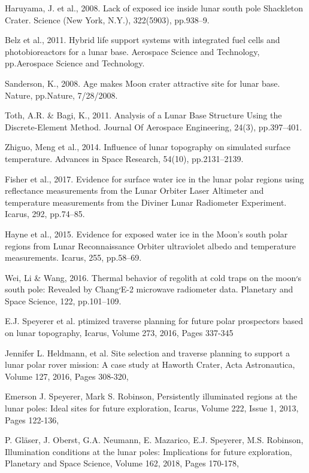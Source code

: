 \documentclass[prl,onecolumn]{revtex4-1}  %
\begin{document}
\begin{thebibliography}{99}
 Haruyama, J. et al., 2008. Lack of exposed ice inside lunar south pole Shackleton Crater. Science (New York, N.Y.), 322(5903), pp.938–9.


 Belz et al., 2011. Hybrid life support systems with integrated fuel cells and photobioreactors for a lunar base. Aerospace Science and Technology, pp.Aerospace Science and Technology.


 Sanderson, K., 2008. Age makes Moon crater attractive site for lunar base. Nature, pp.Nature, 7/28/2008.

Toth, A.R. \& Bagi, K., 2011. Analysis of a Lunar Base Structure Using the Discrete-Element Method. Journal Of Aerospace Engineering, 24(3), pp.397–401.

Zhiguo, Meng et al., 2014. Influence of lunar topography on simulated surface temperature. Advances in Space Research, 54(10), pp.2131–2139.


Fisher et al., 2017. Evidence for surface water ice in the lunar polar regions using reflectance measurements from the Lunar Orbiter Laser Altimeter and temperature measurements from the Diviner Lunar Radiometer Experiment. Icarus, 292, pp.74–85.


Hayne et al., 2015. Evidence for exposed water ice in the Moon’s south polar regions from Lunar Reconnaissance Orbiter ultraviolet albedo and temperature measurements. Icarus, 255, pp.58–69.

Wei, Li \& Wang, 2016. Thermal behavior of regolith at cold traps on the moon׳s south pole: Revealed by Chang׳E-2 microwave radiometer data. Planetary and Space Science, 122, pp.101–109.

E.J. Speyerer et al. ptimized traverse planning for future polar prospectors based on lunar topography, Icarus, Volume 273, 2016, Pages 337-345

Jennifer L. Heldmann, et al. Site selection and traverse planning to support a lunar polar rover mission: A case study at Haworth Crater,
Acta Astronautica, Volume 127, 2016, Pages 308-320,

Emerson J. Speyerer, Mark S. Robinson, Persistently illuminated regions at the lunar poles: Ideal sites for future exploration, Icarus, Volume 222, Issue 1, 2013, Pages 122-136,

P. Gl{\"a}ser, J. Oberst, G.A. Neumann, E. Mazarico, E.J. Speyerer, M.S. Robinson,
Illumination conditions at the lunar poles: Implications for future exploration,
Planetary and Space Science,
Volume 162,
2018,
Pages 170-178,


\end{thebibliography}
\end{document}
